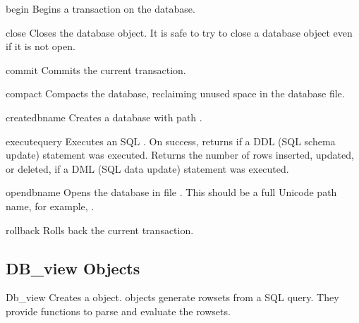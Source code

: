 \begin{methoddesc}[Dbms]{begin}{}
Begins a transaction on the database.
\end{methoddesc}

\begin{methoddesc}[Dbms]{close}{}
Closes the database object. It is safe to try to close a database object 
even if it is not open.
\end{methoddesc}

\begin{methoddesc}[Dbms]{commit}{}
Commits the current transaction.
\end{methoddesc}

\begin{methoddesc}[Dbms]{compact}{}
Compacts the database, reclaiming unused space in the database file. 
\end{methoddesc}

\begin{methoddesc}[Dbms]{create}{dbname}
Creates a database with path .
\end{methoddesc}

\begin{methoddesc}[Dbms]{execute}{query}
Executes an SQL . On success, returns  if a DDL
(SQL schema update) statement was executed. Returns the number of rows
inserted, updated, or deleted, if a DML (SQL data update) statement
was executed.
\end{methoddesc}

\begin{methoddesc}[Dbms]{open}{dbname}
Opens the database in file . This should be a full 
Unicode path name, for example, .
\end{methoddesc}

\begin{methoddesc}[Dbms]{rollback}{}
Rolls back the current transaction.
\end{methoddesc}

\subsection{DB_view Objects}
\label{subsec:mylabel14}

\begin{classdesc}{Db_view}{}
Creates a  object.  objects generate 
rowsets from a SQL query. They provide functions to parse and evaluate the 
rowsets.
\end{classdesc}

